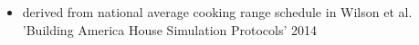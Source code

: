 \begin{itemize}
\item derived from national average cooking range schedule in Wilson et al. 'Building America House Simulation Protocols' 2014
\end{itemize}
